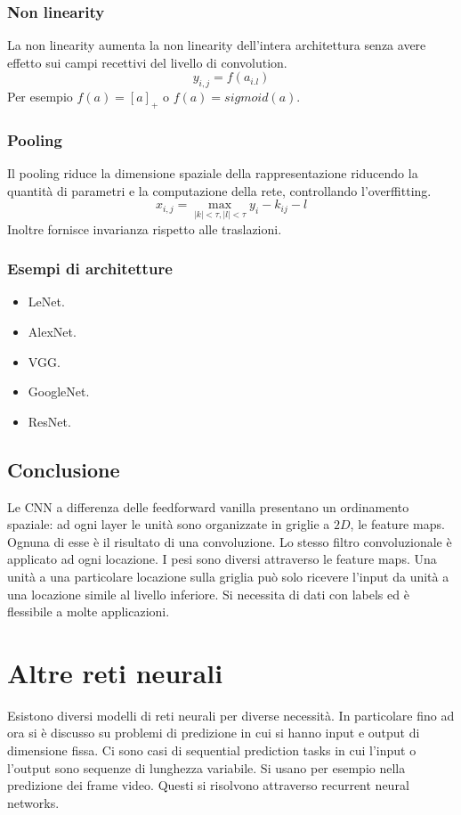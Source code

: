 		\subsubsection{Non linearity}
		La non linearity aumenta la non linearity dell'intera architettura senza avere effetto sui campi recettivi del livello di convolution.
		$$y_{i,j} = f(a_{i.l})$$
		Per esempio $f(a) = [a]_+$ o $f(a) = sigmoid(a)$.

		\subsubsection{Pooling}
		Il pooling riduce la dimensione spaziale della rappresentazione riducendo la quantit\`a di parametri e la computazione della rete, controllando l'overffitting.
		$$x_{i,j} = \max\limits_{|k|<\tau, |l|<\tau}y_i - k_{ij} - l$$
		Inoltre fornisce invarianza rispetto alle traslazioni.

		\subsubsection{Esempi di architetture}
		\begin{multicols}{2}
			\begin{itemize}
				\item LeNet.
				\item AlexNet.
				\item VGG.
				\item GoogleNet.
				\item ResNet.
			\end{itemize}
		\end{multicols}

	\subsection{Conclusione}
	Le CNN a differenza delle feedforward vanilla presentano un ordinamento spaziale: ad ogni layer le unit\`a sono organizzate in griglie a $2D$, le feature maps.
	Ognuna di esse \`e il risultato di una convoluzione.
	Lo stesso filtro convoluzionale \`e applicato ad ogni locazione.
	I pesi sono diversi attraverso le feature maps.
	Una unit\`a a una particolare locazione sulla griglia pu\`o solo ricevere l'input da unit\`a a una locazione simile al livello inferiore.
	Si necessita di dati con labels ed \`e flessibile a molte applicazioni.

\section{Altre reti neurali}
Esistono diversi modelli di reti neurali per diverse necessit\`a.
In particolare fino ad ora si \`e discusso su problemi di predizione in cui si hanno input e output di dimensione fissa.
Ci sono casi di sequential prediction tasks in cui l'input o l'output sono sequenze di lunghezza variabile.
Si usano per esempio nella predizione dei frame video. Questi si risolvono attraverso recurrent neural networks.

